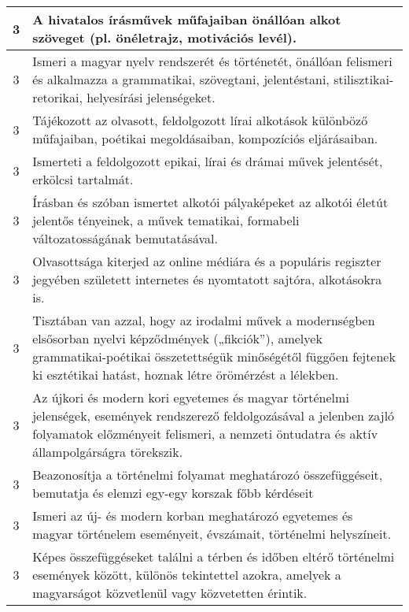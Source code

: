 \begin{longtable}{c | p{12cm} }
                                
                                          3 &  A hivatalos írásművek műfajaiban önállóan alkot szöveget (pl. önéletrajz, motivációs levél). \\ \hline
                                          3 &  Ismeri a magyar nyelv rendszerét és történetét, önállóan felismeri és alkalmazza a grammatikai, szövegtani, jelentéstani, stilisztikai-retorikai, helyesírási jelenségeket. \\ \hline
                                          3 &  Tájékozott az olvasott, feldolgozott lírai alkotások különböző műfajaiban, poétikai megoldásaiban, kompozíciós eljárásaiban. \\ \hline
                                          3 &  Ismerteti a feldolgozott epikai, lírai és drámai művek jelentését, erkölcsi tartalmát. \\ \hline
                                          3 &  Írásban és szóban ismertet alkotói pályaképeket az alkotói életút jelentős tényeinek, a művek tematikai, formabeli változatosságának bemutatásával. \\ \hline
                                          3 &  Olvasottsága kiterjed az online médiára és a populáris regiszter jegyében született internetes és nyomtatott sajtóra, alkotásokra is. \\ \hline
                                          3 &  Tisztában van azzal, hogy az irodalmi művek a modernségben elsősorban nyelvi képződmények („fikciók”), amelyek grammatikai-poétikai összetettségük minőségétől függően fejtenek ki esztétikai hatást, hoznak létre örömérzést a lélekben. \\ \hline
                                          3 &  Az újkori és modern kori egyetemes és magyar történelmi jelenségek, események rendszerező feldolgozásával a jelenben zajló folyamatok előzményeit felismeri, a nemzeti öntudatra és aktív állampolgárságra törekszik. \\ \hline
                                          3 &  Beazonosítja a történelmi folyamat meghatározó összefüggéseit, bemutatja és elemzi egy-egy korszak főbb kérdéseit \\ \hline
                                          3 &  Ismeri az új- és modern korban meghatározó egyetemes és magyar történelem eseményeit, évszámait, történelmi helyszíneit. \\ \hline
                                          3 &  Képes összefüggéseket találni a térben és időben eltérő történelmi események között, különös tekintettel azokra, amelyek a magyarságot közvetlenül vagy közvetetten érintik. \\ \hline

\end{longtable}
